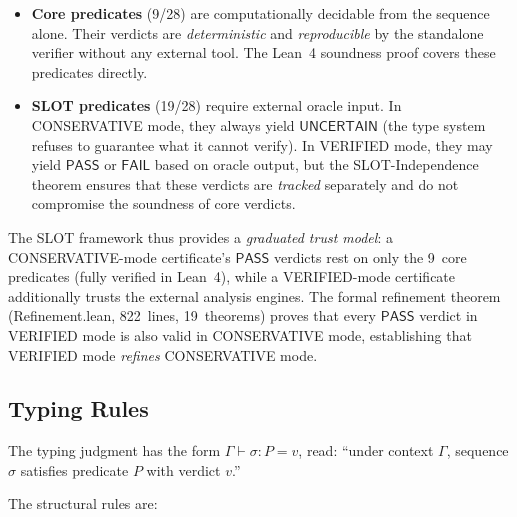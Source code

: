\documentclass[acmsmall,review,anonymous]{acmart}
\newcommand{\PASS}{\ensuremath{\mathsf{PASS}}\xspace}
\newcommand{\FAIL}{\ensuremath{\mathsf{FAIL}}\xspace}
\newcommand{\UNCERTAIN}{\ensuremath{\mathsf{UNCERTAIN}}\xspace}
\newcommand{\seq}{\sigma}
\newcommand{\pred}{P}
\newcommand{\verdict}{v}
\newcommand{\judg}[3]{#1 \vdash #2 : #3}
\begin{document}
\begin{itemize}[leftmargin=*,itemsep=0pt,topsep=1pt]
\item \textbf{Core predicates} (9/28) are computationally decidable
      from the sequence alone.
      Their verdicts are \emph{deterministic} and \emph{reproducible}
      by the standalone verifier without any external tool.
      The Lean~4 soundness proof covers these predicates directly.

\item \textbf{SLOT predicates} (19/28) require external oracle input.
      In CONSERVATIVE mode, they always yield \UNCERTAIN{} (the type
      system refuses to guarantee what it cannot verify).
      In VERIFIED mode, they may yield \PASS{} or \FAIL{} based on
      oracle output, but the SLOT-Independence theorem ensures that
      these verdicts are \emph{tracked} separately and do not
      compromise the soundness of core verdicts.
\end{itemize}

\noindent The SLOT framework thus provides a \emph{graduated trust
model}: a CONSERVATIVE-mode certificate's \PASS{} verdicts rest on
only the 9~core predicates (fully verified in Lean~4), while a
VERIFIED-mode certificate additionally trusts the external analysis
engines.
The formal refinement theorem (Refinement.lean, 822~lines,
19~theorems) proves that every \PASS{} verdict in VERIFIED mode is
also valid in CONSERVATIVE mode, establishing that VERIFIED mode
\emph{refines} CONSERVATIVE mode.

\subsection{Typing Rules}\label{sec:typingrules}

The typing judgment has the form
$\judg{\Gamma}{\seq}{\pred} = \verdict$, read: ``under context
$\Gamma$, sequence $\seq$ satisfies predicate $\pred$ with verdict
$\verdict$.''

The structural rules are:

\end{document}
